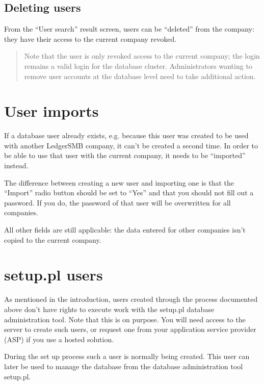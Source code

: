 \subsection{Deleting users}
\label{subsec-user-management-deletion}

From the ``User search'' result screen, users can be ``deleted'' from the company:
they have their access to the current company revoked.

\begin{quote}
Note that the user is only revoked access to the current company; the login remains a valid
login for the database cluster. Administrators wanting to remove user accounts at the database
level need to take additional action.
\end{quote}


\section{User imports}
\label{sec-user-imports}

If a database user already exists, e.g. because this user was created to be used
with another LedgerSMB company, it can't be created a second time. In order to be
able to use that user with the current company, it needs to be ``imported'' instead.

The difference between creating a new user and importing one is that the ``Import''
radio button should be set to ``Yes'' and that you should not fill out a  password.
If you do, the password of that user will be overwritten for all companies.

All other fields are still applicable: the data entered for other companies isn't
copied to the current company.


\section{setup.pl users}
\label{sec-users-management-initial}

As mentioned in the introduction, users created through the process documented above
don't have rights to execute work with the setup.pl database administration tool.
Note that this
is on purpose. You will need access to the server to create such users, or request
one from your application service provider (ASP) if you use a hosted solution.

During the set up process such a user is normally being created. This user can later
be used to manage the database from the database administration tool setup.pl.


